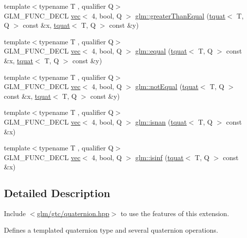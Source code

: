 \begin{DoxyCompactItemize}
\item 
{\footnotesize template$<$typename T , qualifier Q$>$ }\\G\+L\+M\+\_\+\+F\+U\+N\+C\+\_\+\+D\+E\+CL \hyperlink{structglm_1_1vec}{vec}$<$ 4, bool, Q $>$ \hyperlink{group__gtc__quaternion_ga293cb3175d9ad290deaf50984716fd44}{glm\+::greater\+Than\+Equal} (\hyperlink{structglm_1_1tquat}{tquat}$<$ T, Q $>$ const \&x, \hyperlink{structglm_1_1tquat}{tquat}$<$ T, Q $>$ const \&y)
\item 
{\footnotesize template$<$typename T , qualifier Q$>$ }\\G\+L\+M\+\_\+\+F\+U\+N\+C\+\_\+\+D\+E\+CL \hyperlink{structglm_1_1vec}{vec}$<$ 4, bool, Q $>$ \hyperlink{group__gtc__quaternion_ga22089a76bfb7b45b4c34961bb715e2df}{glm\+::equal} (\hyperlink{structglm_1_1tquat}{tquat}$<$ T, Q $>$ const \&x, \hyperlink{structglm_1_1tquat}{tquat}$<$ T, Q $>$ const \&y)
\item 
{\footnotesize template$<$typename T , qualifier Q$>$ }\\G\+L\+M\+\_\+\+F\+U\+N\+C\+\_\+\+D\+E\+CL \hyperlink{structglm_1_1vec}{vec}$<$ 4, bool, Q $>$ \hyperlink{group__gtc__quaternion_ga9494ec3489041958a240963a8a0ac9a0}{glm\+::not\+Equal} (\hyperlink{structglm_1_1tquat}{tquat}$<$ T, Q $>$ const \&x, \hyperlink{structglm_1_1tquat}{tquat}$<$ T, Q $>$ const \&y)
\item 
{\footnotesize template$<$typename T , qualifier Q$>$ }\\G\+L\+M\+\_\+\+F\+U\+N\+C\+\_\+\+D\+E\+CL \hyperlink{structglm_1_1vec}{vec}$<$ 4, bool, Q $>$ \hyperlink{group__gtc__quaternion_ga31f4378ab97985177e208f4f4f8b1fd3}{glm\+::isnan} (\hyperlink{structglm_1_1tquat}{tquat}$<$ T, Q $>$ const \&x)
\item 
{\footnotesize template$<$typename T , qualifier Q$>$ }\\G\+L\+M\+\_\+\+F\+U\+N\+C\+\_\+\+D\+E\+CL \hyperlink{structglm_1_1vec}{vec}$<$ 4, bool, Q $>$ \hyperlink{group__gtc__quaternion_ga139abc0f7f89553e341f8be95bf8d3cb}{glm\+::isinf} (\hyperlink{structglm_1_1tquat}{tquat}$<$ T, Q $>$ const \&x)
\end{DoxyCompactItemize}


\subsection{Detailed Description}
Include $<$\hyperlink{gtc_2quaternion_8hpp}{glm/gtc/quaternion.\+hpp}$>$ to use the features of this extension.

Defines a templated quaternion type and several quaternion operations. 

